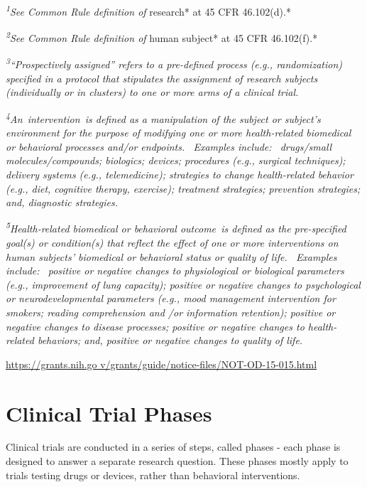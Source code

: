 \documentclass[]{book}
\begin{document}
\emph{\textsuperscript{1}See Common Rule definition of }research* at 45
CFR 46.102(d).*

\emph{\textsuperscript{2}See Common Rule definition of }human subject*
at 45 CFR 46.102(f).*

\emph{\textsuperscript{3}``Prospectively assigned'' refers to a
pre-defined process (e.g., randomization) specified in a protocol that
stipulates the assignment of research subjects (individually or in
clusters) to one or more arms of a clinical trial.}

\emph{\textsuperscript{4}An~intervention~is defined as a manipulation of
the subject or subject's environment for the purpose of modifying one or
more health-related biomedical or behavioral processes and/or
endpoints.~ Examples include:~ drugs/small molecules/compounds;
biologics; devices; procedures (e.g., surgical techniques); delivery
systems (e.g., telemedicine); strategies to change health-related
behavior (e.g., diet, cognitive therapy, exercise); treatment
strategies; prevention strategies; and, diagnostic strategies.}

\emph{\textsuperscript{5}Health-related biomedical or behavioral
outcome~is defined as the pre-specified goal(s) or condition(s) that
reflect the effect of one or more interventions on human subjects'
biomedical or behavioral status or quality of life.~ Examples include:~
positive or negative changes to physiological or biological parameters
(e.g., improvement of lung capacity); positive or negative changes to
psychological or neurodevelopmental parameters (e.g., mood management
intervention for smokers; reading comprehension and /or information
retention); positive or negative changes to disease processes; positive
or negative changes to health-related behaviors; and, positive or
negative changes to quality of life.}

\href{https://grants.nih.go\%20v/grants/guide/notice-files/NOT-OD-15-015.html}{https://grants.nih.go
v/grants/guide/notice-files/NOT-OD-15-015.html}

\section{Clinical Trial Phases}\label{clinical-trial-phases}

Clinical trials are conducted in a series of steps, called phases - each
phase is designed to answer a separate research question. These phases
mostly apply to trials testing drugs or devices, rather than behavioral
interventions.
\end{document}
